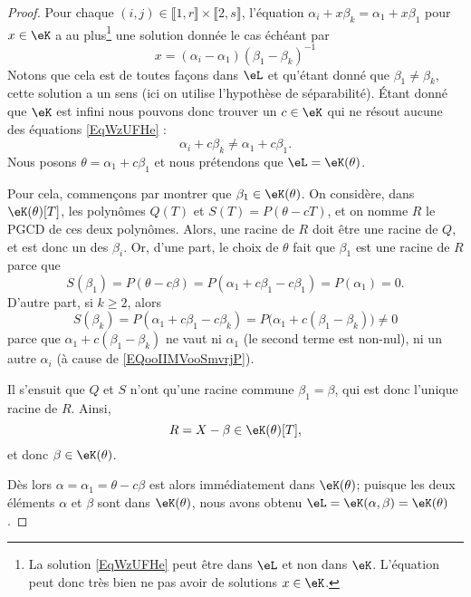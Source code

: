 \begin{proof}
    Pour chaque \( (i,j)\in \llbracket 1,r\rrbracket \times \llbracket 2,s\rrbracket \), l'équation \( \alpha_i+x\beta_k=\alpha_1+x\beta_1\) pour \( x\in \eK\) a au plus\footnote{La solution \eqref{EqWzUFHe} peut être dans $ \eL$ et non dans $\eK$. L'équation peut donc très bien ne pas avoir de solutions $x\in \eK$.} une solution donnée le cas échéant par
    \begin{equation}    \label{EqWzUFHe}
        x=(\alpha_i-\alpha_1)(\beta_1-\beta_k)^{-1}
    \end{equation}
    Notons que cela est de toutes façons dans \( \eL\) et qu'étant donné que \( \beta_1\neq \beta_k\), cette solution a un sens (ici on utilise l'hypothèse de séparabilité). Étant donné que \( \eK\) est infini nous pouvons donc trouver un \( c\in \eK\) qui ne résout aucune des équations \eqref{EqWzUFHe} :
    \begin{equation}\label{EQooIIMVooSmvrjP}
        \alpha_i+c\beta_k\neq \alpha_1+c\beta_1.
    \end{equation}
    Nous posons \( \theta=\alpha_1+c\beta_1\) et nous prétendons que \( \eL=\eK(\theta)\).

    Pour cela, commençons par montrer que \( \beta_1 \in \eK(\theta)\). On considère, dans \( \eK(\theta)[T]\), les polynômes \( Q(T)\) et \( S(T)=P(\theta-cT)\), et on nomme \( R\) le PGCD de ces deux polynômes. Alors, une racine de \( R\) doit être une racine de \( Q\), et est donc un des \( \beta_i\). Or, d'une part, le choix de \( \theta\) fait que \( \beta_1\) est une racine de \( R\) parce que
    \begin{equation}
        S(\beta_1)=P(\theta-c\beta)=P(\alpha_1+c\beta_1-c\beta_1)=P(\alpha_1)=0.
    \end{equation}
    D'autre part, si \( k\geq 2\), alors
    \begin{equation}
        S(\beta_k)=P(\alpha_1 + c \beta_1 - c \beta_k) = P\big(\alpha_1 +c(\beta_1-\beta_k)\big)\neq 0
    \end{equation}
    parce que \( \alpha_1 +c(\beta_1 - \beta_k)\) ne vaut ni \( \alpha_1 \) (le second terme est non-nul), ni un autre \( \alpha_i\) (à cause de \eqref{EQooIIMVooSmvrjP}).

    Il s'ensuit que \( Q \) et \(S \) n'ont qu'une racine commune \( \beta_1 = \beta \), qui est donc l'unique racine de \( R\). Ainsi,
    \begin{equation}
        R=X-\beta\in \eK(\theta)[T],
    \end{equation}
    et donc \( \beta\in \eK(\theta)\).

    Dès lors \( \alpha=\alpha_1=\theta-c\beta\) est alors immédiatement dans \( \eK(\theta)\); puisque les deux éléments \( \alpha\) et \( \beta\) sont dans \( \eK(\theta)\), nous avons obtenu \( \eL=\eK(\alpha,\beta)=\eK(\theta)\).

\end{proof}

